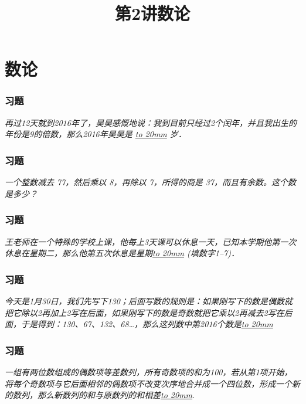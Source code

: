 \section{数论}

\title[第2讲\quad 数论]{第2讲\quad 数论} 
\author{}
\date{}

\begin{frame}
    \titlepage
\end{frame}

\setcounter{framecounter}{0}

\begin{frame}
    \frametitle{习题\theframecounter}
    \vspace*{-3cm}
    \center\textit{再过12天就到2016年了，昊昊感慨地说：我到目前只经过2个闰年，并且我出生的年份是9的倍数，那么2016年昊昊是 \underline{\hbox to 20mm{}} 岁．} 
\end{frame}

\begin{frame}
    \frametitle{习题\theframecounter}
    \vspace*{-3cm}
    \textit{一个整数减去 77，然后乘以 8，再除以 7，所得的商是 37，而且有余数。这个数是多少？} 
\end{frame}

\begin{frame}
    \frametitle{习题\theframecounter}
    \vspace*{-3cm}
    \textit{王老师在一个特殊的学校上课，他每上3天课可以休息一天，已知本学期他第一次休息在星期二，那么他第五次休息是星期\underline{\hbox to 20mm{}} (填数字1--7)．} 
\end{frame}

\begin{frame}
    \frametitle{习题\theframecounter}
    \vspace*{-3cm}
    \textit{今天是1月30日，我们先写下130；后面写数的规则是：如果刚写下的数是偶数就把它除以2再加上2写在后面，如果刚写下的数是奇数就把它乘以2再减去2写在后面，于是得到：130、67、132、68…，那么这列数中第2016个数是\underline{\hbox to 20mm{}}} 
\end{frame}

\begin{frame}
    \frametitle{习题\theframecounter}
    \vspace*{-3cm}
    \textit{一组有两位数组成的偶数项等差数列，所有奇数项的和为100，若从第1项开始，将每个奇数项与它后面相邻的偶数项不改变次序地合并成一个四位数，形成一个新的数列，那么新数列的和与原数列的和相差\underline{\hbox to 20mm{}}.} 
\end{frame}


